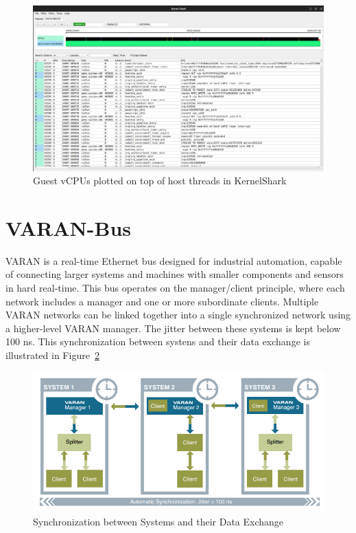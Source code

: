 \documentclass[MMR,Master,english]{twbook}
\begin{document}
\begin{figure}[H]
	\centering
	\includegraphics[width=1.0\columnwidth]{img/kernelshark_combo.png}
	\caption[Guest vCPUs plotted on top of host threads in KernelShark]{Guest vCPUs plotted on top of host threads in KernelShark}
	\label{fig:kernelshark_combo}
\end{figure}

\section{VARAN-Bus}\label{sec:varan}

VARAN is a real-time Ethernet bus designed for industrial automation, capable of connecting larger systems and machines with smaller components and sensors in hard real-time. This bus operates on the manager/client principle, where each network includes a manager and one or more subordinate clients. Multiple VARAN networks can be linked together into a single synchronized network using a higher-level VARAN manager. The jitter between these systems is kept below 100 ns. This synchronization between systens and their data exchange is illustrated in Figure~\ref{fig:multiple_varans}

\begin{figure}[H]
	\centering
	\includegraphics[width=0.75\columnwidth]{img/multiple_varans.png}
	\caption[Synchronization between Systems and their Data Exchange]{Synchronization between Systems and their Data Exchange}
	\label{fig:multiple_varans}
\end{figure}
\end{document}
